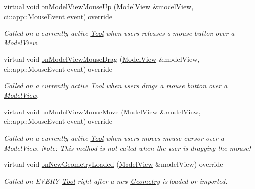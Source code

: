 \begin{DoxyCompactItemize}
\mbox{\label{classpepr3d_1_1_triangle_painter_a896ecc3264191911cb5f960fe983453e}} 
virtual void \mbox{\hyperlink{classpepr3d_1_1_triangle_painter_a896ecc3264191911cb5f960fe983453e}{on\+Model\+View\+Mouse\+Up}} (\mbox{\hyperlink{classpepr3d_1_1_model_view}{Model\+View}} \&model\+View, ci\+::app\+::\+Mouse\+Event event) override
\begin{DoxyCompactList}\small\item\em Called on a currently active \mbox{\hyperlink{classpepr3d_1_1_tool}{Tool}} when users releases a mouse button over a \mbox{\hyperlink{classpepr3d_1_1_model_view}{Model\+View}}. \end{DoxyCompactList}\item 
\mbox{\label{classpepr3d_1_1_triangle_painter_ada44c24799296b71b5f2d46651921343}} 
virtual void \mbox{\hyperlink{classpepr3d_1_1_triangle_painter_ada44c24799296b71b5f2d46651921343}{on\+Model\+View\+Mouse\+Drag}} (\mbox{\hyperlink{classpepr3d_1_1_model_view}{Model\+View}} \&model\+View, ci\+::app\+::\+Mouse\+Event event) override
\begin{DoxyCompactList}\small\item\em Called on a currently active \mbox{\hyperlink{classpepr3d_1_1_tool}{Tool}} when users drags a mouse button over a \mbox{\hyperlink{classpepr3d_1_1_model_view}{Model\+View}}. \end{DoxyCompactList}\item 
\mbox{\label{classpepr3d_1_1_triangle_painter_a3d19c5d44381645259c63d51452ce464}} 
virtual void \mbox{\hyperlink{classpepr3d_1_1_triangle_painter_a3d19c5d44381645259c63d51452ce464}{on\+Model\+View\+Mouse\+Move}} (\mbox{\hyperlink{classpepr3d_1_1_model_view}{Model\+View}} \&model\+View, ci\+::app\+::\+Mouse\+Event event) override
\begin{DoxyCompactList}\small\item\em Called on a currently active \mbox{\hyperlink{classpepr3d_1_1_tool}{Tool}} when users moves mouse cursor over a \mbox{\hyperlink{classpepr3d_1_1_model_view}{Model\+View}}. Note\+: This method is not called when the user is dragging the mouse! \end{DoxyCompactList}\item 
\mbox{\label{classpepr3d_1_1_triangle_painter_a988c5e1fa7d556d013ebffae277b6bd7}} 
virtual void \mbox{\hyperlink{classpepr3d_1_1_triangle_painter_a988c5e1fa7d556d013ebffae277b6bd7}{on\+New\+Geometry\+Loaded}} (\mbox{\hyperlink{classpepr3d_1_1_model_view}{Model\+View}} \&model\+View) override
\begin{DoxyCompactList}\small\item\em Called on E\+V\+E\+RY \mbox{\hyperlink{classpepr3d_1_1_tool}{Tool}} right after a new \mbox{\hyperlink{classpepr3d_1_1_geometry}{Geometry}} is loaded or imported. \end{DoxyCompactList}\end{DoxyCompactItemize}
